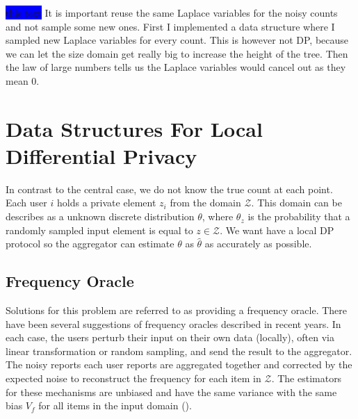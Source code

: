 \documentclass[11pt]{article}
\theoremstyle{definition}
\begin{document}
\colorbox{blue}{this text} It is important reuse the same Laplace variables for the noisy counts and not sample some new ones. First I implemented a data structure where I sampled new Laplace variables for every count. This is however not DP, because we can let the size domain get really big to increase the height of the tree. Then the law of large numbers tells us the Laplace variables would cancel out as they mean $0$.

\section{Data Structures For Local Differential Privacy}
In contrast to the central case, we do not know the true count at each point.
Each user $i$ holds a private element $z_i$ from the domain $\mathcal{Z}$. This domain can be describes as a unknown discrete distribution $\theta$, where $\theta_z$ is the probability that a randomly sampled input element is equal to $z\in\mathcal{Z}$. We want have a local DP protocol so the aggregator can estimate $\theta$ as $\hat{\theta}$ as accurately as possible.
\subsection{Frequency Oracle}\label{freq}
Solutions for this problem are referred to as providing a frequency oracle. There have been several suggestions of frequency oracles described in recent years. In each case, the users perturb their input on their own data (locally), often via linear transformation or random sampling, and send the result to the aggregator. The noisy reports each user reports are aggregated together and corrected by the expected noise to reconstruct the frequency for each item in $\mathcal{Z}$. The estimators for these mechanisms are unbiased and have the same variance with the same bias $V_f$ for all items in the input domain (\cite[3]{local}). \\
\end{document}
